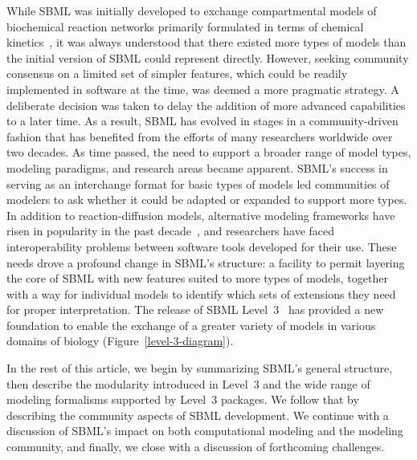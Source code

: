 \documentclass{sbml-paper}
\begin{document}
While SBML was initially developed to exchange compartmental models of biochemical reaction networks primarily formulated in terms of chemical kinetics~\citep{hucka_2001}, it was always understood that there existed more types of models than the initial version of SBML could represent directly. However, seeking community consensus on a limited set of simpler features, which could be readily implemented in software at the time, was deemed a more pragmatic strategy. A deliberate decision was taken to delay the addition of more advanced capabilities to a later time.  As a result, SBML has evolved in stages in a community-driven fashion that has benefited from the efforts of many researchers worldwide over two decades.  As time passed, the need to support a broader range of model types, modeling paradigms, and research areas became apparent.  SBML's success in serving as an interchange format for basic types of models led communities of modelers to ask whether it could be adapted or expanded to support more types.  In addition to reaction-diffusion models, alternative modeling frameworks have risen in popularity in the past decade~\citep{Machado2011modelinga}, and researchers have faced interoperability problems between software tools developed for their use.  These needs drove a profound change in SBML's structure: a facility to permit layering the core of SBML with new features suited to more types of models, together with a way for individual models to identify which sets of extensions they need for proper interpretation.  The release of SBML Level~3~\citep{Hucka2010a} has provided a new foundation to enable the exchange of a greater variety of models in various domains of biology (Figure~\ref{level-3-diagram}).

In the rest of this article, we begin by summarizing SBML's general structure, then describe the modularity introduced in Level~3 and the wide range of modeling formalisms supported by Level~3 packages.  We follow that by describing the community aspects of SBML development.  We continue with a discussion of SBML's impact on both computational modeling and the modeling community, and finally, we close with a discussion of forthcoming challenges.
\end{document}
